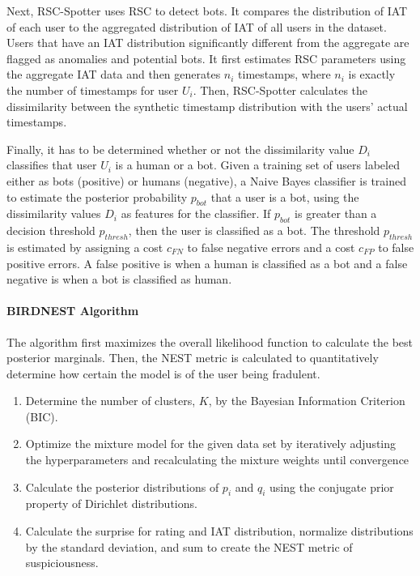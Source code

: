 \documentclass[11pt, oneside]{article}   	%
\begin{document}
\quad Next, RSC-Spotter uses RSC to detect bots.
It compares the distribution of IAT of each user to the aggregated distribution of IAT of all users in the dataset.
Users that have an IAT distribution significantly different from the aggregate are flagged as anomalies and potential bots.
It first estimates RSC parameters using the aggregate IAT data and then generates $n_i$ timestamps, where $n_i$ is exactly the number of timestamps for user $U_i$.
Then, RSC-Spotter calculates the dissimilarity between the synthetic timestamp distribution with the users' actual timestamps.

\quad Finally, it has to be determined whether or not the dissimilarity value $D_i$ classifies that user $U_i$ is a human or a bot.
Given a training set of users labeled either as bots (positive) or humans (negative), a Naive Bayes classifier is trained to estimate the posterior probability $p_{bot}$ that a user is a bot, using the dissimilarity values $D_i$ as features for the classifier.
If $p_{bot}$ is greater than a decision threshold $p_{thresh}$, then the user is classified as a bot.
The threshold $p_{thresh}$ is estimated by assigning a cost $c_{FN}$ to false negative errors and a cost $c_{FP}$ to false positive errors.
A false positive is when a human is classified as a bot and a false negative is when a bot is classified as human.

\paragraph*{BIRDNEST Algorithm}
\quad

\quad The algorithm \cite{birdnest} first maximizes the overall likelihood function to calculate the best posterior marginals.
Then, the NEST metric is calculated to quantitatively determine how certain the model is of the user being fradulent.
\begin{enumerate}
	\item Determine the number of clusters, $K$, by the Bayesian Information Criterion (BIC).
	\item Optimize the mixture model for the given data set by iteratively adjusting the hyperparameters and recalculating the mixture weights until convergence
	\item Calculate the posterior distributions of $p_i$ and $q_i$ using the conjugate prior property of Dirichlet distributions.
	\item Calculate the surprise for rating and IAT distribution, normalize distributions by the standard deviation, and sum to create the NEST metric of suspiciousness. 
\end{enumerate}
\end{document}
